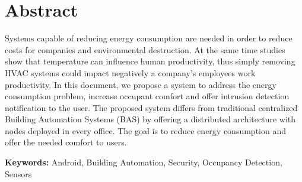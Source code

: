 \chapter*{Abstract}


Systems capable of reducing energy consumption are needed in order to reduce costs for companies and environmental destruction. At the same time studies show that temperature can influence human productivity, thus simply removing HVAC systems could impact negatively a company's employees work productivity.
In this document, we propose a system to address the energy consumption problem, increase occupant comfort and offer intrusion detection notification to the user. The proposed system differs from traditional centralized Building Automation Systems (BAS) by offering a distributed architecture with nodes deployed in every office. The goal is to reduce energy consumption and offer the needed comfort to users.
\vspace{1cm}

\textbf{\Large Keywords:} Android, Building Automation, Security, Occupancy Detection, Sensors

\cleardoublepage
